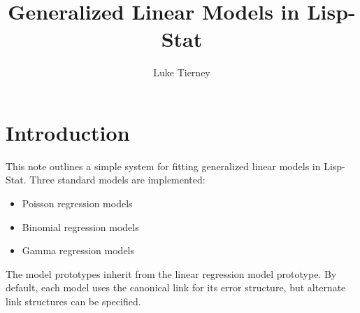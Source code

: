 
\newcommand{\refitem}[1]{%
  \begin{list}%
        {}%
        {\setlength{\leftmargin}{.25in}\setlength{\itemindent}{-.25in}}
  \item #1%
  \end{list}}

\setlength{\textwidth}{6in}
\setlength{\textheight}{8.75in}
\setlength{\topmargin}{-0.25in}
\setlength{\oddsidemargin}{0.25in}

\newcommand{\dcode}[1]{{\tt \hyphenchar\tentt="2D #1\hyphenchar\tentt=-1}}

\newcommand{\param}[1]{$\langle${\em #1\/}$\rangle$}
\newcommand{\protoimage}[1]{\begin{picture}(100,20)\put(0,0){\makebox(100,20){\tt #1}}\put(50,10){\oval(100,20)}\end{picture}}
\newcommand{\wprotoimage}[1]{\begin{picture}(120,20)\put(0,0){\makebox(120,20){\tt #1}}\put(60,10){\oval(120,20)}\end{picture}}

\title{Generalized Linear Models in Lisp-Stat}
\author{Luke Tierney}


\maketitle

\section{Introduction}
This note outlines a simple system for fitting generalized linear
models in Lisp-Stat. Three standard models are implemented:
\begin{itemize}
\item Poisson regression models
\item Binomial regression models
\item Gamma regression models
\end{itemize}
The model prototypes inherit from the linear regression model
prototype. By default, each model uses the canonical link for its
error structure, but alternate link structures can be specified.

